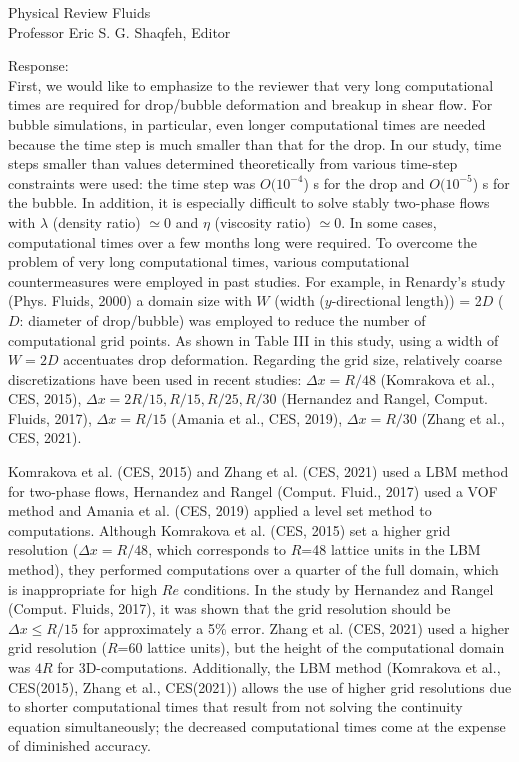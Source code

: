 \documentclass{letter}
\begin{document}
\begin{letter}{
Physical Review Fluids\\
Professor Eric S. G. Shaqfeh, Editor\\}
\begin{enumerate}
Response: \\
First, we would like to emphasize to the reviewer that very long
computational times are required for drop/bubble deformation and breakup in
shear flow. For bubble simulations, in particular, even longer computational
times are needed because the time step is much smaller than that for the drop.
In our study, time steps smaller than values determined theoretically from
various time-step constraints were used: the time step was $O(10^{-4}$) s for
the drop and $O(10^{-5}$) s for the bubble.  In addition, it is especially difficult to
solve stably two-phase flows with $\lambda$ (density ratio) $\simeq 0$ and
$\eta$ (viscosity ratio) $\simeq 0$. In some cases, computational times
over a few months long were required.  To overcome the problem of very long
computational times, various computational countermeasures were employed in
past studies. For example, in Renardy's study (Phys. Fluids, 2000) a domain
size with $W$ (width ($y$-directional length)) = 2$D$ ($D$: diameter of
drop/bubble) was employed to reduce the number of computational grid
points.  As shown in Table I\hspace{-1.2pt}I\hspace{-1.2pt}I in this study, using a width of $W =
2D$ accentuates drop deformation. Regarding the grid size, relatively coarse
discretizations have been used in recent studies: $\Delta x =R/48$ (Komrakova et al.,
CES, 2015), $\Delta x =2R/15, R/15, R/25, R/30$ (Hernandez and Rangel, Comput.
Fluids, 2017), $\Delta x =R/15$ (Amania et al., CES, 2019), $\Delta x =R/30$
(Zhang et al., CES, 2021).

\medskip
Komrakova et al. (CES, 2015) and Zhang et al. (CES, 2021) used a LBM method for
two-phase flows, Hernandez and Rangel (Comput. Fluid., 2017) used a VOF method
and Amania et al. (CES, 2019) applied a level set method to computations.
Although Komrakova et al. (CES, 2015) set a higher grid resolution ($\Delta x
=R/48$, which corresponds to $R$=48 lattice units in the LBM method), they
performed computations over a quarter of the full domain, which is inappropriate
for high $Re$ conditions.  In the study by Hernandez and Rangel (Comput.
Fluids, 2017), it was shown that the grid resolution should be $\Delta x \leq
R/15$ for approximately a 5\% error. Zhang et al. (CES, 2021) used a higher grid
resolution ($R$=60 lattice units), but the height of the computational domain was
$4R$ for 3D-computations.  Additionally, the LBM method (Komrakova et al.,
CES(2015), Zhang et al., CES(2021)) allows the use of higher grid resolutions
due to shorter computational times that result from not solving the continuity
equation simultaneously; the decreased computational times come at the
expense of diminished accuracy.


\end{enumerate}
\end{letter}
\end{document}
